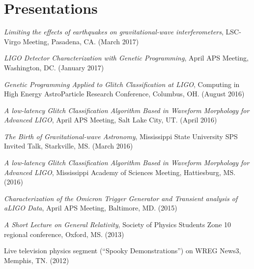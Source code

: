 \section{\sc Presentations}


\emph{Limiting the effects of earthquakes on gravitational-wave interferometers}, LSC-Virgo Meeting, Pasadena, CA. (March 2017)

\emph{LIGO Detector Characterization with 
Genetic Programming}, April APS Meeting, Washington, DC. (January 2017)

\emph{Genetic Programming Applied to Glitch Classification at LIGO}, Computing in High Energy AstroParticle Research Conference, Columbus, OH. (August 2016)

\emph{A low-latency Glitch Classification Algorithm Based in Waveform Morphology for Advanced LIGO}, April APS Meeting, Salt Lake City, UT. (April 2016)

\emph{The Birth of Gravitational-wave Astronomy}, Mississippi State University SPS Invited Talk, Starkville, MS. (March 2016)

\emph{A low-latency Glitch Classification Algorithm Based in Waveform Morphology for Advanced LIGO}, Mississippi Academy of Sciences Meeting, Hattiesburg, MS. (2016)

\emph{Characterization of the Omicron Trigger Generator and Transient analysis of aLIGO Data}, April APS Meeting, Baltimore, MD. (2015)

\emph{A Short Lecture on General Relativity}, Society of Physics Students Zone 10 regional conference, Oxford, MS. (2013)

Live television physics segment (``Spooky Demonstrations'') on WREG News3, Memphis, TN. (2012)


\endinput